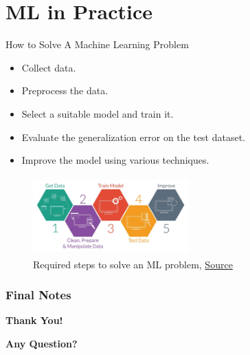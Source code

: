 \documentclass[compress,oilve]{beamer}
\begin{document}
\section{ML in Practice}
\begin{frame}{How to Solve A Machine Learning Problem}
	\begin{itemize}
		\item Collect data.
		\item Preprocess the data.
		\item Select a suitable model and train it.
		\item Evaluate the generalization error on the test dataset.
		\item Improve the model using various techniques.
	\end{itemize}

	\begin{figure}
	 \centering
	 \includegraphics[width=6cm, height=3cm]{Figs/7.jpeg}  
	 \caption{Required steps to solve an ML problem, \href{https://tinyurl.com/2m7epjl2}{Source}}
	\end{figure}

\end{frame}


\frametitle{Final Notes}
\centering
\vspace{50 pt}
\textbf{Thank You!}
\vspace{50pt}

\textbf{Any Question?}
\end{document}
